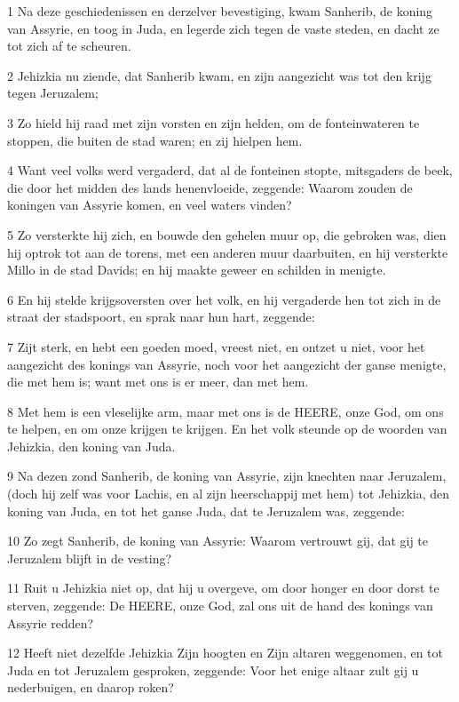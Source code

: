 \par 1 Na deze geschiedenissen en derzelver bevestiging, kwam Sanherib, de koning van Assyrie, en toog in Juda, en legerde zich tegen de vaste steden, en dacht ze tot zich af te scheuren.
\par 2 Jehizkia nu ziende, dat Sanherib kwam, en zijn aangezicht was tot den krijg tegen Jeruzalem;
\par 3 Zo hield hij raad met zijn vorsten en zijn helden, om de fonteinwateren te stoppen, die buiten de stad waren; en zij hielpen hem.
\par 4 Want veel volks werd vergaderd, dat al de fonteinen stopte, mitsgaders de beek, die door het midden des lands henenvloeide, zeggende: Waarom zouden de koningen van Assyrie komen, en veel waters vinden?
\par 5 Zo versterkte hij zich, en bouwde den gehelen muur op, die gebroken was, dien hij optrok tot aan de torens, met een anderen muur daarbuiten, en hij versterkte Millo in de stad Davids; en hij maakte geweer en schilden in menigte.
\par 6 En hij stelde krijgsoversten over het volk, en hij vergaderde hen tot zich in de straat der stadspoort, en sprak naar hun hart, zeggende:
\par 7 Zijt sterk, en hebt een goeden moed, vreest niet, en ontzet u niet, voor het aangezicht des konings van Assyrie, noch voor het aangezicht der ganse menigte, die met hem is; want met ons is er meer, dan met hem.
\par 8 Met hem is een vleselijke arm, maar met ons is de HEERE, onze God, om ons te helpen, en om onze krijgen te krijgen. En het volk steunde op de woorden van Jehizkia, den koning van Juda.
\par 9 Na dezen zond Sanherib, de koning van Assyrie, zijn knechten naar Jeruzalem, (doch hij zelf was voor Lachis, en al zijn heerschappij met hem) tot Jehizkia, den koning van Juda, en tot het ganse Juda, dat te Jeruzalem was, zeggende:
\par 10 Zo zegt Sanherib, de koning van Assyrie: Waarom vertrouwt gij, dat gij te Jeruzalem blijft in de vesting?
\par 11 Ruit u Jehizkia niet op, dat hij u overgeve, om door honger en door dorst te sterven, zeggende: De HEERE, onze God, zal ons uit de hand des konings van Assyrie redden?
\par 12 Heeft niet dezelfde Jehizkia Zijn hoogten en Zijn altaren weggenomen, en tot Juda en tot Jeruzalem gesproken, zeggende: Voor het enige altaar zult gij u nederbuigen, en daarop roken?
